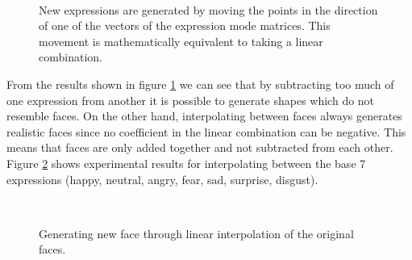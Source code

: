 \documentclass[11pt,a4paper]{report}
\begin{document}
\begin{figure}[H]
\centering
{}\\

\caption{New expressions are generated by moving the points in the direction of one of
  the vectors of the expression mode matrices. This movement is mathematically
  equivalent to taking a linear combination.}\label{fg:faceaddsub}
\end{figure}

From the results shown in figure \ref{fg:faceaddsub} we can see that by
subtracting too much of one expression from another it is possible to generate
shapes which do not resemble faces. On the other hand, interpolating between
faces always generates realistic faces since no coefficient in the linear
combination can be negative. This means that faces are only added together and
not subtracted from each other. Figure \ref{fg:faceinter} shows experimental
results for interpolating between the base 7 expressions (happy, neutral, angry,
fear, sad, surprise, disgust).

\begin{figure}[H]
\centering
{}\\

\caption{Generating new face through linear interpolation of the original faces.}\label{fg:faceinter}
\end{figure}
\end{document}
